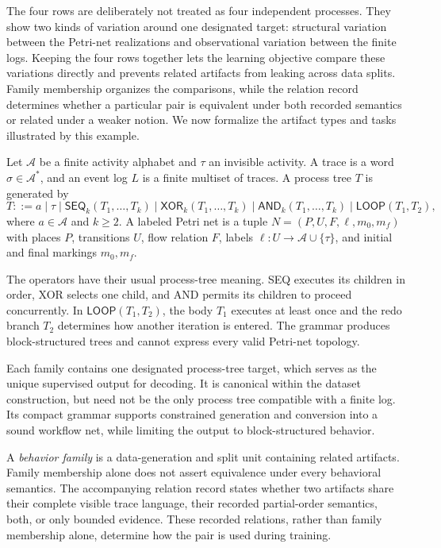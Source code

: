 \documentclass[pdflatex,sn-basic]{sn-jnl}
\newcommand{\tauact}{\ensuremath{\tau}}
\begin{document}
The four rows are deliberately not treated as four independent processes. They show two kinds of variation around one designated target: structural variation between the Petri-net realizations and observational variation between the finite logs. Keeping the four rows together lets the learning objective compare these variations directly and prevents related artifacts from leaking across data splits. Family membership organizes the comparisons, while the relation record determines whether a particular pair is equivalent under both recorded semantics or related under a weaker notion. We now formalize the artifact types and tasks illustrated by this example.

Let $\mathcal{A}$ be a finite activity alphabet and $\tauact$ an invisible activity. A trace is a word $\sigma\in\mathcal{A}^{*}$, and an event log $L$ is a finite multiset of traces. A process tree $T$ is generated by
\begin{equation}
T ::= a \mid \tauact \mid \mathsf{SEQ}_{k}(T_1,\ldots,T_k)
 \mid \mathsf{XOR}_{k}(T_1,\ldots,T_k)
 \mid \mathsf{AND}_{k}(T_1,\ldots,T_k)
 \mid \mathsf{LOOP}(T_1,T_2),
\label{eq:grammar}
\end{equation}
where $a\in\mathcal{A}$ and $k\geq2$. A labeled Petri net is a tuple $N=(P,U,F,\ell,m_0,m_f)$ with places $P$, transitions $U$, flow relation $F$, labels $\ell:U\rightarrow\mathcal{A}\cup\{\tauact\}$, and initial and final markings $m_0,m_f$.

The operators have their usual process-tree meaning. \textsf{SEQ} executes its children in order, \textsf{XOR} selects one child, and \textsf{AND} permits its children to proceed concurrently. In $\mathsf{LOOP}(T_1,T_2)$, the body $T_1$ executes at least once and the redo branch $T_2$ determines how another iteration is entered. The grammar produces block-structured trees and cannot express every valid Petri-net topology.

Each family contains one designated process-tree target, which serves as the unique supervised output for decoding. It is canonical within the dataset construction, but need not be the only process tree compatible with a finite log. Its compact grammar supports constrained generation and conversion into a sound workflow net, while limiting the output to block-structured behavior.

A \emph{behavior family} is a data-generation and split unit containing related artifacts. Family membership alone does not assert equivalence under every behavioral semantics. The accompanying relation record states whether two artifacts share their complete visible trace language, their recorded partial-order semantics, both, or only bounded evidence. These recorded relations, rather than family membership alone, determine how the pair is used during training.
\end{document}
